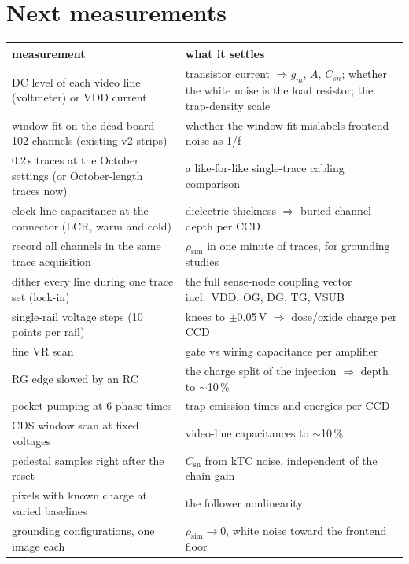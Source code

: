 \documentclass[11pt]{article}
\begin{document}
\section{Next measurements}\label{sec:next}
\begin{table}[H]\centering\small
\begin{tabular}{p{5.3cm}p{9.4cm}}\toprule
measurement & what it settles\\\midrule
DC level of each video line (voltmeter) or VDD current & transistor current $\Rightarrow g_m$, $A$, $C_{sn}$; whether
the white noise is the load resistor; the trap-density scale\\
window fit on the dead board-102 channels (existing v2 strips) & whether the window fit mislabels frontend noise as 1/f\\
0.2\,s traces at the October settings (or October-length traces now) & a like-for-like single-trace cabling comparison\\
clock-line capacitance at the connector (LCR, warm and cold) & dielectric thickness $\Rightarrow$ buried-channel depth
per CCD\\
record all channels in the same trace acquisition & $\rho_\text{sim}$ in one minute of traces, for grounding studies\\
dither every line during one trace set (lock-in) & the full sense-node coupling vector incl.\ VDD, OG, DG, TG, VSUB\\
single-rail voltage steps (10 points per rail) & knees to $\pm$0.05\,V $\Rightarrow$ dose/oxide charge per CCD\\
fine VR scan & gate vs wiring capacitance per amplifier\\
RG edge slowed by an RC & the charge split of the injection $\Rightarrow$ depth to $\sim$10\,\%\\
pocket pumping at 6 phase times & trap emission times and energies per CCD\\
CDS window scan at fixed voltages & video-line capacitances to $\sim$10\,\%\\
pedestal samples right after the reset & $C_\text{sn}$ from kTC noise, independent of the chain gain\\
pixels with known charge at varied baselines & the follower nonlinearity\\
grounding configurations, one image each & $\rho_\text{sim}\to0$, white noise toward the frontend floor\\\bottomrule
\end{tabular}\end{table}
\end{document}
